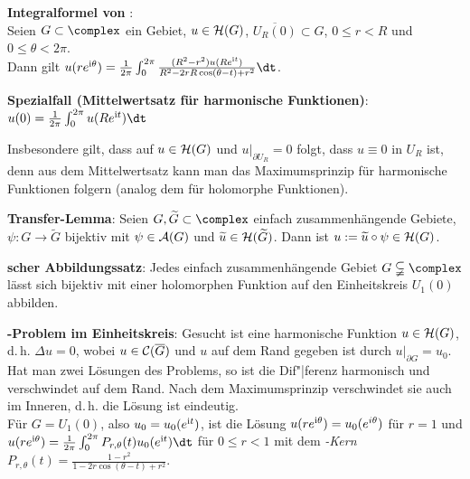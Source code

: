 \textbf{Integralformel von }:\\
Seien $G \subset \complex$ ein Gebiet, $u \in \mathcal{H}(G)$,
$\overline{U_R(0)} \subset G$, $0 \le r < R$ und $0 \le \theta < 2\pi$.\\
Dann gilt $u(r e^{\i\theta}) = \frac{1}{2\pi}
\int_0^{2\pi} \frac{(R^2 - r^2) u(R e^{\i t})}
{R^2 - 2rR \cos(\theta - t) + r^2} \dt$.

\textbf{Spezialfall (Mittelwertsatz für harmonische Funktionen)}:
$u(0) = \frac{1}{2\pi} \int_0^{2\pi} u(R e^{\i t}) \dt$

Insbesondere gilt, dass auf $u \in \mathcal{H}(G)$ und $u|_{\partial U_R} = 0$ folgt,
dass $u \equiv 0$ in $U_R$ ist, denn aus dem Mittelwertsatz kann
man das Maximumsprinzip für harmonische Funktionen folgern
(analog dem für holomorphe Funktionen).

\linie

\textbf{Transfer-Lemma}:
Seien $G, \widetilde{G} \subset \complex$ einfach zusammenhängende
Gebiete, $\psi\colon G \rightarrow \widetilde{G}$ bijektiv mit $\psi \in \mathcal{A}(G)$
und $\widetilde{u} \in \mathcal{H}(\widetilde{G})$.
Dann ist $u := \widetilde{u} \circ \psi \in \mathcal{H}(G)$.

\textbf{scher Abbildungssatz}:
Jedes einfach zusammenhängende Gebiet $G \subsetneqq \complex$ lässt sich
bijektiv mit einer holomorphen Funktion auf den Einheitskreis $U_1(0)$
abbilden.

\textbf{-Problem im Einheitskreis}:
Gesucht ist eine harmonische Funktion $u \in \mathcal{H}(G)$,
d.\,h. $\Delta u = 0$, wobei $u \in \mathcal{C}(\overline{G})$ und
$u$ auf dem Rand gegeben ist durch $u|_{\partial G} = u_0$.\\
Hat man zwei Lösungen des Problems, so ist die Dif"|ferenz harmonisch und
verschwindet auf dem Rand.
Nach dem Maximumsprinzip verschwindet sie auch im Inneren, d.\,h. die Lösung
ist eindeutig.\\
Für $G = U_1(0)$, also $u_0 = u_0(e^{\mathrm{i} t})$, ist die Lösung
$u(r e^{\mathrm{i} \theta}) = u_0(e^{i \theta})$ für $r = 1$ und\\
$u(r e^{\i \theta}) = \frac{1}{2\pi}
\int_0^{2\pi} P_{r,\theta}(t) u_0(e^{\i t}) \dt$ für $0 \le r < 1$ mit
dem \emph{-Kern}
$P_{r,\theta}(t) = \frac{1 - r^2}{1 - 2r\cos(\theta - t) + r^2}$.

\pagebreak

